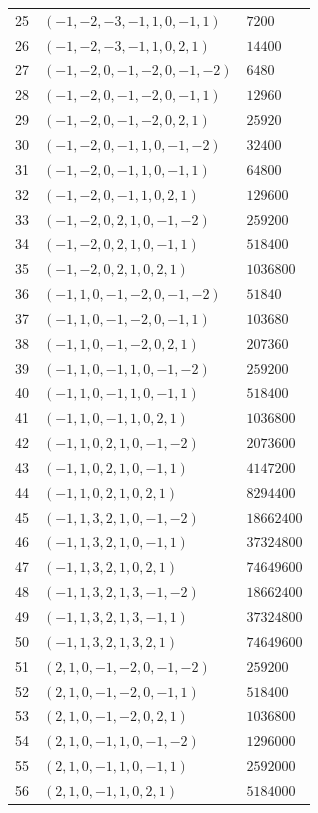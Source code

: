 \begin{longtable}{@{}rll@{}}
25 & $(-1,-2,-3,-1,1,0,-1,1)$ & $7200$\\
26 & $(-1,-2,-3,-1,1,0,2,1)$ & $14400$\\
27 & $(-1,-2,0,-1,-2,0,-1,-2)$ & $6480$\\
28 & $(-1,-2,0,-1,-2,0,-1,1)$ & $12960$\\
29 & $(-1,-2,0,-1,-2,0,2,1)$ & $25920$\\
30 & $(-1,-2,0,-1,1,0,-1,-2)$ & $32400$\\
31 & $(-1,-2,0,-1,1,0,-1,1)$ & $64800$\\
32 & $(-1,-2,0,-1,1,0,2,1)$ & $129600$\\
33 & $(-1,-2,0,2,1,0,-1,-2)$ & $259200$\\
34 & $(-1,-2,0,2,1,0,-1,1)$ & $518400$\\
35 & $(-1,-2,0,2,1,0,2,1)$ & $1036800$\\
36 & $(-1,1,0,-1,-2,0,-1,-2)$ & $51840$\\
37 & $(-1,1,0,-1,-2,0,-1,1)$ & $103680$\\
38 & $(-1,1,0,-1,-2,0,2,1)$ & $207360$\\
39 & $(-1,1,0,-1,1,0,-1,-2)$ & $259200$\\
40 & $(-1,1,0,-1,1,0,-1,1)$ & $518400$\\
41 & $(-1,1,0,-1,1,0,2,1)$ & $1036800$\\
42 & $(-1,1,0,2,1,0,-1,-2)$ & $2073600$\\
43 & $(-1,1,0,2,1,0,-1,1)$ & $4147200$\\
44 & $(-1,1,0,2,1,0,2,1)$ & $8294400$\\
45 & $(-1,1,3,2,1,0,-1,-2)$ & $18662400$\\
46 & $(-1,1,3,2,1,0,-1,1)$ & $37324800$\\
47 & $(-1,1,3,2,1,0,2,1)$ & $74649600$\\
48 & $(-1,1,3,2,1,3,-1,-2)$ & $18662400$\\
49 & $(-1,1,3,2,1,3,-1,1)$ & $37324800$\\
50 & $(-1,1,3,2,1,3,2,1)$ & $74649600$\\
51 & $(2,1,0,-1,-2,0,-1,-2)$ & $259200$\\
52 & $(2,1,0,-1,-2,0,-1,1)$ & $518400$\\
53 & $(2,1,0,-1,-2,0,2,1)$ & $1036800$\\
54 & $(2,1,0,-1,1,0,-1,-2)$ & $1296000$\\
55 & $(2,1,0,-1,1,0,-1,1)$ & $2592000$\\
56 & $(2,1,0,-1,1,0,2,1)$ & $5184000$\\

\end{longtable}
